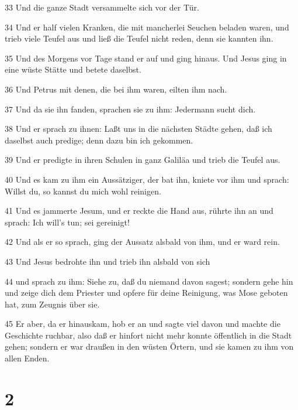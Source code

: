 \par 33 Und die ganze Stadt versammelte sich vor der Tür.
\par 34 Und er half vielen Kranken, die mit mancherlei Seuchen beladen waren, und trieb viele Teufel aus und ließ die Teufel nicht reden, denn sie kannten ihn.
\par 35 Und des Morgens vor Tage stand er auf und ging hinaus. Und Jesus ging in eine wüste Stätte und betete daselbst.
\par 36 Und Petrus mit denen, die bei ihm waren, eilten ihm nach.
\par 37 Und da sie ihn fanden, sprachen sie zu ihm: Jedermann sucht dich.
\par 38 Und er sprach zu ihnen: Laßt uns in die nächsten Städte gehen, daß ich daselbst auch predige; denn dazu bin ich gekommen.
\par 39 Und er predigte in ihren Schulen in ganz Galiläa und trieb die Teufel aus.
\par 40 Und es kam zu ihm ein Aussätziger, der bat ihn, kniete vor ihm und sprach: Willst du, so kannst du mich wohl reinigen.
\par 41 Und es jammerte Jesum, und er reckte die Hand aus, rührte ihn an und sprach: Ich will's tun; sei gereinigt!
\par 42 Und als er so sprach, ging der Aussatz alsbald von ihm, und er ward rein.
\par 43 Und Jesus bedrohte ihn und trieb ihn alsbald von sich
\par 44 und sprach zu ihm: Siehe zu, daß du niemand davon sagest; sondern gehe hin und zeige dich dem Priester und opfere für deine Reinigung, was Mose geboten hat, zum Zeugnis über sie.
\par 45 Er aber, da er hinauskam, hob er an und sagte viel davon und machte die Geschichte ruchbar, also daß er hinfort nicht mehr konnte öffentlich in die Stadt gehen; sondern er war draußen in den wüsten Örtern, und sie kamen zu ihm von allen Enden.

\chapter{2}

